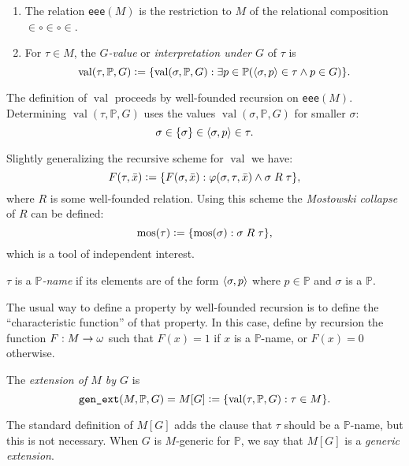 \documentclass[11pt,english]{article}
\renewcommand{\PP}{\mathbb{P}}
\DeclareMathOperator{\val}{val}
\begin{document}
\begin{definition}
  \begin{enumerate}
  \item The relation \verb|eee|$(M)$ is the restriction to $M$ of the
    relational composition 
    ${\in}\circ{\in}\circ{\in}$. 
  \item For $\tau\in M$, the \emph{$G$-value} or \emph{interpretation
    under $G$} of $\tau$ is
    \[
    \val(\tau,\PP,G)\defi \{\val(\sigma,\PP,G) : \exists p\in \PP
    (\lb\sigma,p\rb\in\tau \y p\in G)\}.
    \]
  \end{enumerate}
\end{definition}

The definition of $\val$ proceeds by well-founded recursion on
\verb|eee|$(M)$. Determining  $\val(\tau,\PP,G)$ uses the values
$\val(\sigma,\PP,G)$ for smaller $\sigma$:
\[
\sigma\in\{\sigma\}\in\langle\sigma,p\rangle\in\tau.
\]

\begin{remark}
  Slightly generalizing the recursive scheme for $\val$ we have:
  \[
  F(\tau,\bar{x})\mathrel{\mathop:}= \{F(\sigma,\bar{x}) : \varphi(\sigma,\tau,\bar{x}) \wedge
  \sigma\mathrel{R}\tau\}, 
  \]
  where $R$ is some well-founded relation. Using this scheme the
  \emph{Mostowski collapse} of $R$ can be defined:
  \[
  \operatorname{mos}(\tau)\mathrel{\mathop:}= \{\operatorname{mos}(\sigma) : \sigma\mathrel{R}\tau\},
  \]
  which is a tool of independent interest.
\end{remark}

\begin{definition}
  $\tau$ is a \emph{$\PP$-name} if its elements are of the form
  $\langle\sigma,p\rangle$ where $p\in\PP$ and $\sigma$ is a $\PP$.
\end{definition}
The usual way to define a property by well-founded recursion is to
define the ``characteristic function'' of that property. In this case,
define by recursion the function $F:M\to\omega$ such that $F(x)=1$  if
$x$ is a $\PP$-name, or $F(x)=0$ otherwise.

\begin{definition}
  The \emph{extension of $M$ by $G$} is
  \[
  \verb|gen_ext|(M,\PP,G) = M[G] \defi \{\val(\tau,\PP,G): \tau\in M\}.
  \]
\end{definition}
The standard definition of $M[G]$ adds the clause that $\tau$ should be
a $\PP$-name, but this is not necessary. When $G$ is $M$-generic for
$\PP$, we say that $M[G]$ is a \emph{generic extension}.
\end{document}
